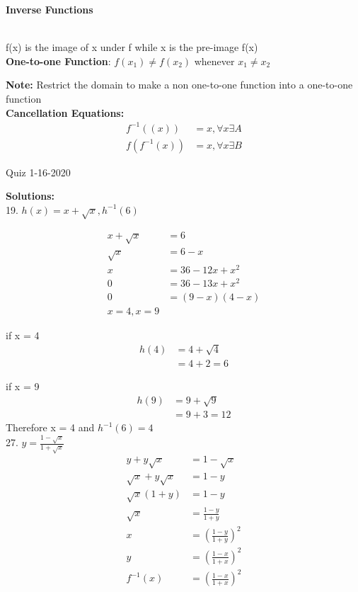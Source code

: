\documentclass[letterpaper, 12pt]{article}
\begin{document}
\thispagestyle{fancy}
\begin{Large}\textbf{Inverse Functions}\end{Large} \\

f(x) is the image of x under f while x is the pre-image f(x)\\

\textbf{One-to-one Function}: $f(x_{1}) \neq f(x_{2})$ whenever $x_{1} \neq x_{2}$

\textbf{Note: }Restrict the domain to make a non one-to-one function into a one-to-one function\\

\textbf{Cancellation Equations:}
\begin{align*}
f^{-1}((x)) &= x, \forall x \exists A\\
f(f^{-1}(x)) &= x, \forall x \exists B
\end{align*}

Quiz 1-16-2020

\textbf{Solutions:}\\
19. $h(x) = x + \sqrt{x}, h^{-1}(6)$

\begin{align*}
x + \sqrt{x} &= 6\\
\sqrt{x} &=  6 - x\\
x &= 36 - 12x + x^{2}\\
0 &= 36 - 13x + x^{2}\\
0 &= (9-x)(4-x)\\
x = 4, x = 9
\end{align*}

if x = 4
\begin{align*}
h(4) &=  4 + \sqrt{4}\\ 
&=  4 + 2 = 6
\end{align*}

if x = 9
\begin{align*}
h(9) &=  9 + \sqrt{9}\\
&= 9 + 3 = 12
\end{align*}
Therefore x = 4 and $h^{-1}(6) = 4$\\

27. $y = \frac{1-\sqrt{x}}{1+\sqrt{x}}$
\begin{align*}
y + y\sqrt{x} &= 1 - \sqrt{x}\\
\sqrt{x} + y \sqrt{x} &= 1-y\\
\sqrt{x}(1+y)&= 1-y\\
\sqrt{x} &= \frac{1-y}{1+y}\\
x &= \left(\frac{1-y}{1+y}\right) ^{2}\\
y &= \left(\frac{1-x}{1+x}\right) ^{2}\\
f^{-1}(x) &= \left(\frac{1-x}{1+x}\right) ^{2}
\end{align*}
\end{document}
